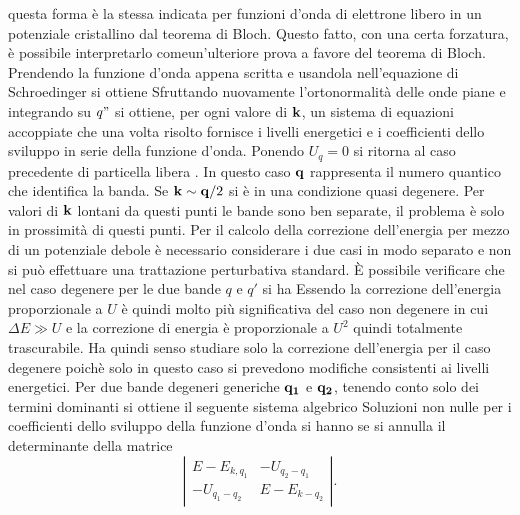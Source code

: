 questa forma è la stessa indicata per funzioni d'onda di elettrone libero in un potenziale cristallino dal teorema di Bloch. Questo fatto, con una certa forzatura, è possibile interpretarlo comeun'ulteriore prova a favore del teorema di Bloch. Prendendo la funzione d'onda appena scritta e usandola nell'equazione di Schroedinger si ottiene
Sfruttando nuovamente l'ortonormalità delle onde piane e integrando su $q"$ si ottiene, per ogni valore di $\it\bf k$, un sistema di equazioni accoppiate
che una volta risolto fornisce i livelli energetici e i coefficienti dello sviluppo in serie della funzione d'onda. Ponendo $U_q=0$ si ritorna al caso precedente di particella libera
.
In questo caso $\it\bf q$ rappresenta il numero quantico che identifica la banda. Se ${\it\bf k} \sim {\it\bf q} /2$ si è in una condizione quasi degenere. Per valori di $\it\bf k$ lontani da questi punti le bande sono ben separate, il problema è solo in prossimità di questi punti. Per il calcolo della correzione dell'energia per mezzo di un potenziale debole è necessario considerare i due casi in modo separato e non si può effettuare una trattazione perturbativa standard. \`E possibile verificare che nel caso degenere per le due bande $q$ e $q'$ si ha 
Essendo la correzione dell'energia proporzionale a $U$  è quindi molto più significativa del caso non degenere in cui $\Delta E\gg U$ e la correzione di energia è proporzionale a $U^2$ quindi totalmente trascurabile. Ha quindi senso studiare solo la correzione dell'energia per il caso degenere poichè solo in questo caso si prevedono modifiche consistenti ai livelli energetici.
Per due bande degeneri generiche $\it\bf q_1$ e $\it\bf q_2$, tenendo conto solo dei termini dominanti si ottiene il seguente sistema algebrico
Soluzioni non nulle per i coefficienti dello sviluppo della funzione d'onda si hanno se si annulla il determinante della matrice
\[ \left| \begin{array}{cc}
E-E_{k,q_1} & -U_{q_2-q_1}  \\
-U_{q_1-q_2} & E-E_{k-q_2} \end{array} \right|.\]
